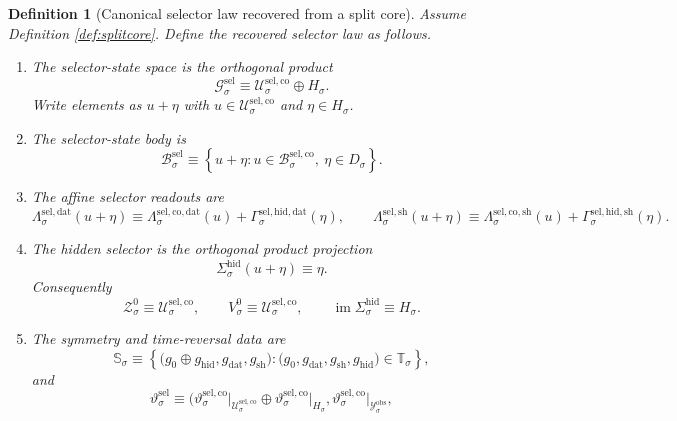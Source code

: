 \documentclass[11pt]{article}
\newcommand{\DataSpace}[1]{\mathcal Y_{#1}^{\mathrm{obs}}}
\newcommand{\GenSpace}[1]{\mathcal G_{#1}^{\mathrm{sel}}}
\newcommand{\GenBody}[1]{\mathcal B_{#1}^{\mathrm{sel}}}
\newcommand{\GenData}[1]{\Lambda_{#1}^{\mathrm{sel,dat}}}
\newcommand{\GenShell}[1]{\Lambda_{#1}^{\mathrm{sel,sh}}}
\newcommand{\HiddenSel}[1]{\Sigma_{#1}^{\mathrm{hid}}}
\newcommand{\ZeroHiddenSlice}[1]{\mathcal Z_{#1}^{0}}
\newcommand{\ZeroHiddenVec}[1]{V_{#1}^{0}}
\newcommand{\GapSpace}[1]{H_{#1}}
\newcommand{\GapBody}[1]{D_{#1}}
\newcommand{\GenSym}[1]{\mathbb S_{#1}}
\newcommand{\GenTime}[1]{\vartheta_{#1}^{\mathrm{sel}}}
\newcommand{\SelCoreSpace}[1]{\mathcal U_{#1}^{\mathrm{sel,co}}}
\newcommand{\SelCoreBody}[1]{\mathcal B_{#1}^{\mathrm{sel,co}}}
\newcommand{\SelCoreData}[1]{\Lambda_{#1}^{\mathrm{sel,co,dat}}}
\newcommand{\SelCoreShell}[1]{\Lambda_{#1}^{\mathrm{sel,co,sh}}}
\newcommand{\SelHiddenData}[1]{\Gamma_{#1}^{\mathrm{sel,hid,dat}}}
\newcommand{\SelHiddenShell}[1]{\Gamma_{#1}^{\mathrm{sel,hid,sh}}}
\newcommand{\SelCoreSym}[1]{\mathbb T_{#1}}
\newcommand{\SelCoreTime}[1]{\vartheta_{#1}^{\mathrm{sel,co}}}
\newtheorem{definition}{Definition}
\begin{document}
\begin{definition}[Canonical selector law recovered from a split core]
\label{def:recovered}
Assume Definition \ref{def:splitcore}. Define the recovered selector law as follows.
\begin{enumerate}
    \item The selector-state space is the orthogonal product
    \begin{equation}
    \GenSpace{\sigma}
    \equiv
    \SelCoreSpace{\sigma}\oplus\GapSpace{\sigma}.
    \label{eq:recspace}
    \end{equation}
    Write elements as \(u+\eta\) with \(u\in\SelCoreSpace{\sigma}\) and \(\eta\in\GapSpace{\sigma}\).
    \item The selector-state body is
    \begin{equation}
    \GenBody{\sigma}
    \equiv
    \left\{
    u+\eta:
    u\in\SelCoreBody{\sigma},
    \ \eta\in\GapBody{\sigma}
    \right\}.
    \label{eq:recbody}
    \end{equation}
    \item The affine selector readouts are
    \begin{equation}
    \GenData{\sigma}(u+\eta)
    \equiv
    \SelCoreData{\sigma}(u)+\SelHiddenData{\sigma}(\eta),
    \qquad
    \GenShell{\sigma}(u+\eta)
    \equiv
    \SelCoreShell{\sigma}(u)+\SelHiddenShell{\sigma}(\eta).
    \label{eq:recreadouts}
    \end{equation}
    \item The hidden selector is the orthogonal product projection
    \begin{equation}
    \HiddenSel{\sigma}(u+\eta)\equiv \eta.
    \label{eq:reselector}
    \end{equation}
    Consequently
    \[
    \ZeroHiddenSlice{\sigma}
    \equiv
    \SelCoreSpace{\sigma},
    \qquad
    \ZeroHiddenVec{\sigma}
    \equiv
    \SelCoreSpace{\sigma},
    \qquad
    \operatorname{im}\HiddenSel{\sigma}
    \equiv
    \GapSpace{\sigma}.
    \]
    \item The symmetry and time-reversal data are
    \[
    \GenSym{\sigma}
    \equiv
    \left\{
    \bigl(
    g_{0}\oplus g_{\mathrm{hid}},
    g_{\mathrm{dat}},
    g_{\mathrm{sh}}
    \bigr):
    \bigl(
    g_{0},g_{\mathrm{dat}},g_{\mathrm{sh}},g_{\mathrm{hid}}
    \bigr)\in\SelCoreSym{\sigma}
    \right\},
    \]
    and
    \[
    \GenTime{\sigma}
    \equiv
    \bigl(
    \SelCoreTime{\sigma}\big|_{\SelCoreSpace{\sigma}}
    \oplus
    \SelCoreTime{\sigma}\big|_{\GapSpace{\sigma}},
    \SelCoreTime{\sigma}\big|_{\DataSpace{\sigma}},
\]
\end{enumerate}
\end{definition}
\end{document}
